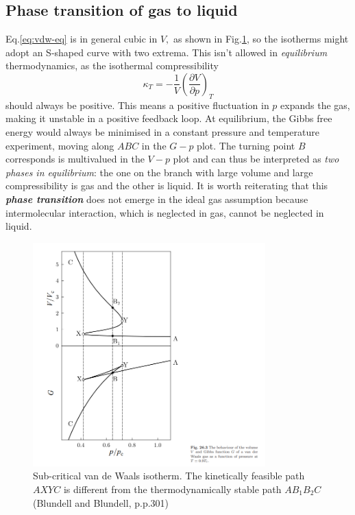 \documentclass{article}
\theoremstyle{nonumberplain}
\begin{document}
\subsection{Phase transition of gas to liquid}
Eq.\eqref{eq:vdw-eq} is in general cubic in $V,$ as shown in Fig.\ref{fig:vdw-isotherm}, so the isotherms might adopt an S-shaped curve with two extrema. This isn't allowed in \textit{equilibrium} thermodynamics, as the isothermal compressibility 
\[
    \kappa_T = - \frac{1}{V}\left(\frac{\partial V}{\partial p} \right)_T
\]
should always be positive. This means a positive fluctuation in $p$ expands the gas, making it unstable in a positive feedback loop. At equilibrium, the Gibbs free energy would always be minimised in a constant pressure and temperature experiment, moving along $ABC$ in the $G-p$ plot. The turning point $B$ corresponds is multivalued in the $V-p$ plot and can thus be interpreted as \textit{two phases in equilibrium}: the one on the branch with large volume and large compressibility is gas and the other is liquid. It is worth reiterating that this \textit{\textbf{phase transition}} does not emerge in the ideal gas assumption because intermolecular interaction, which is neglected in gas, cannot be neglected in liquid. 

\begin{figure}[ht]
    \centering
    \includegraphics[width=0.8\textwidth]{fig/Blundell-p301.png}
    \caption{Sub-critical van de Waals isotherm. The kinetically feasible path $AXYC$ is different from the thermodynamically stable path $AB_1B_2C$ (Blundell and Blundell, p.p.301)} 
    \label{fig:vdw-isotherm}
\end{figure}
\end{document}

